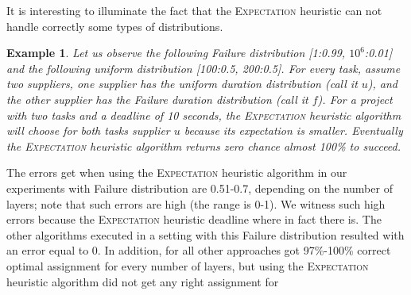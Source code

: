 \documentclass[letterpaper]{article} %
\newtheorem{example}{Example}
\newcommand{\expectation}{\textsc{Expectation}\xspace}
\begin{document}
It is interesting to illuminate the fact that the \expectation heuristic can not handle correctly some types of distributions.
\begin{example}
Let us observe the following Failure distribution [1:0.99, $10^6$:0.01] and the following uniform distribution [100:0.5, 200:0.5]. For every task, assume two suppliers, one supplier has the uniform duration distribution (call it $u$), and the other supplier has the Failure duration distribution (call it $f$). For a project with two tasks and a deadline of 10 seconds, the \expectation heuristic algorithm will choose for both tasks supplier $u$ because its expectation is smaller. Eventually the \expectation heuristic algorithm returns zero chance  almost 100\% to succeed.
\end{example}
The errors  get when using the \expectation heuristic algorithm in our experiments with Failure distribution are 0.51-0.7, depending on the number of layers; note that such errors are high (the range is 0-1). We witness such high errors because the \expectation heuristic  deadline where in fact there is. The other algorithms executed in a setting with this Failure distribution resulted with an error equal to 0. In addition, for all other approaches  got 97\%-100\% correct optimal assignment for every number of layers, but using the \expectation heuristic algorithm  did not get any right assignment for 
\end{document}
